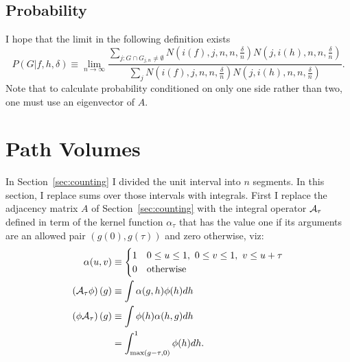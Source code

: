 \documentclass[12pt]{article} \usepackage{amsmath,amsfonts}
\newcommand{\Aop}{{\cal A}}
\newcommand{\Aindicate}{\alpha}
\newcommand{\function}{\phi}
\begin{document}
\subsection{Probability}
\label{sec:probability1}

I hope that the limit in the following definition exists
\begin{equation}
  \newcommand\Nin[2]{N\left(#1,#2, n, n, \frac{\delta}{n}\right)}
  \label{eq:p1}
  P(G|f,h,\delta) \equiv \lim_{n\rightarrow \infty} \frac{
    \sum_{j:G\cap G_{j,n} \neq \emptyset} \Nin{i(f)}{j}\Nin{j}{i(h)}}
  {\sum_j \Nin{i(f)}{j}\Nin{j}{i(h)}}.
\end{equation}
Note that to calculate probability conditioned on only one side rather
than two, one must use an eigenvector of $A$.

\section{Path Volumes}
\label{sec:operator}

In Section~\ref{sec:counting} I divided the unit interval into $n$
segments.  In this section, I replace sums over those intervals with
integrals.  First I replace the adjacency matrix $A$ of
Section~\ref{sec:counting} with the integral operator $\Aop_\tau$
defined in term of the kernel function $\Aindicate_\tau$ that has the
value one if its arguments are an allowed pair
$\left( g(0), g(\tau) \right)$ and zero otherwise, viz:
\begin{subequations}
  \begin{align}
    \label{eq:indicate}
    \Aindicate(u,v) &\equiv
    \begin{cases}
      1 & 0 \leq u \leq 1,~ 0 \leq v \leq 1,~ v \leq u + \tau\\
      0 & \text{otherwise}
    \end{cases}\\
    \label{eq:operateright}
    \left( \Aop_\tau  \function \right)(g) &\equiv \int
            \Aindicate(g,h) \function(h) dh \\
    \label{eq:operateleft}
    \left( \function \Aop_\tau \right)(g) &\equiv \int
           \function(h) \Aindicate(h,g) dh \\
    &= \int_{\max(g-\tau,0)}^1 \function(h) dh.
  \end{align}
\end{subequations}
\end{document}
